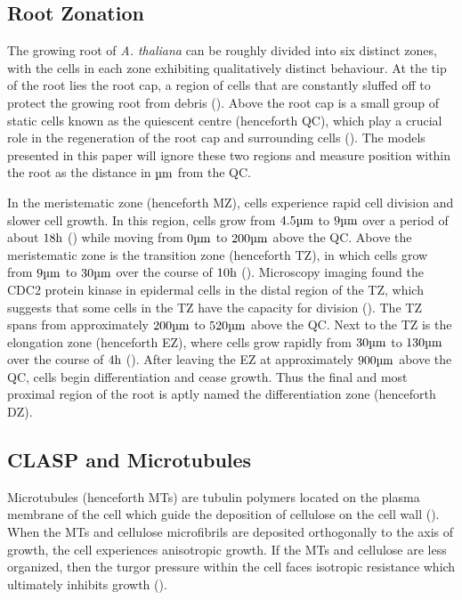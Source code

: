 \subsection{Root Zonation}

The growing root of \emph{A. thaliana} can be roughly divided into six distinct zones, with the cells in each zone exhibiting qualitatively distinct behaviour. At the tip of the root lies the root cap, a region of cells that are constantly sluffed off to protect the growing root from debris (\cite{kumpf2015}). Above the root cap is a small group of static cells known as the quiescent centre (henceforth QC), which play a crucial role in the regeneration of the root cap and surrounding cells (\cite{matosevich2021}). The models presented in this paper will ignore these two regions and measure position within the root as the distance in $\um$ from the QC. 

\medskip

In the meristematic zone (henceforth MZ), cells experience rapid cell division and slower cell growth. In this region, cells grow from $4.5\um$ to $9\um$ over a period of about $18\h$ (\cite{verbelen2006}) while moving from $0\um$ to $200\um$ above the QC. Above the meristematic zone is the transition zone (henceforth TZ), in which cells grow from $9\um$ to $30\um$ over the course of $10\h$ (\cite{verbelen2006}). Microscopy imaging found the CDC2 protein kinase in epidermal cells in the distal region of the TZ, which suggests that some cells in the TZ have the capacity for division (\cite{verbelen2006}). The TZ spans from approximately $200\um$ to $520\um$ above the QC. Next to the TZ is the elongation zone (henceforth EZ), where cells grow rapidly from $30\um$ to $130\um$ over the course of $4\h$ (\cite{verbelen2006}). After leaving the EZ at approximately $900\um$ above the QC, cells begin differentiation and cease growth. Thus the final and most proximal region of the root is aptly named the differentiation zone (henceforth DZ).

\subsection{CLASP and Microtubules}

Microtubules (henceforth MTs) are tubulin polymers located on the plasma membrane of the cell which guide the deposition of cellulose on the cell wall (\cite{hamant2010}). When the MTs and cellulose microfibrils are deposited orthogonally to the axis of growth, the cell experiences anisotropic growth. If the MTs and cellulose are less organized, then the turgor pressure within the cell faces isotropic resistance which ultimately inhibits growth (\cite{hamant2010}).

